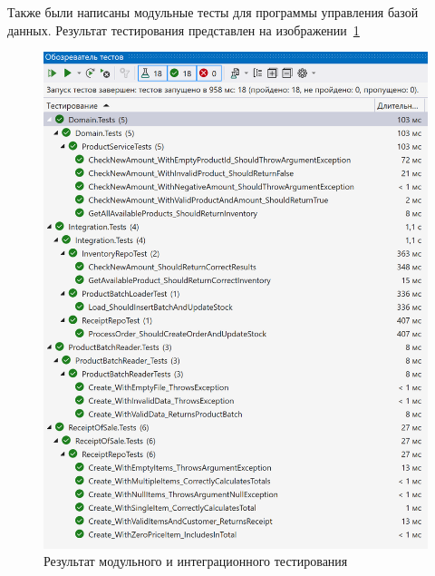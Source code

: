 Также были написаны модульные тесты для программы управления базой данных.
Результат тестирования представлен на изображении~\ref{fig:tests}
\begin{figure}
	\centering
	\includegraphics[width=1\linewidth]{pictures/tests}
	\caption{Результат модульного и интеграционного тестирования}
	\label{fig:tests}
\end{figure}
\clearpage
